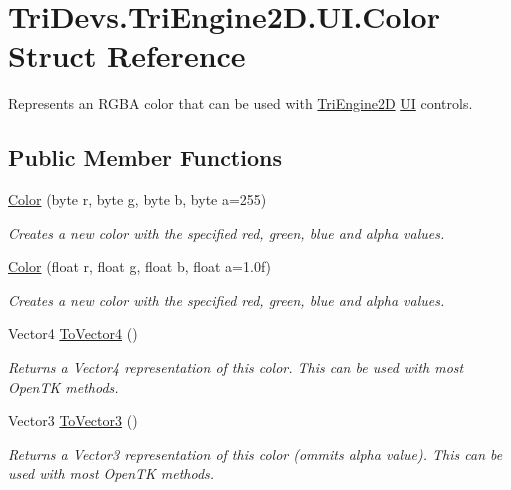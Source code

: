 \hypertarget{struct_tri_devs_1_1_tri_engine2_d_1_1_u_i_1_1_color}{\section{Tri\-Devs.\-Tri\-Engine2\-D.\-U\-I.\-Color Struct Reference}
\label{struct_tri_devs_1_1_tri_engine2_d_1_1_u_i_1_1_color}
}


Represents an R\-G\-B\-A color that can be used with \hyperlink{namespace_tri_devs_1_1_tri_engine2_d}{Tri\-Engine2\-D} \hyperlink{namespace_tri_devs_1_1_tri_engine2_d_1_1_u_i}{U\-I} controls.  


\subsection*{Public Member Functions}
\begin{DoxyCompactItemize}
\item 
\hyperlink{struct_tri_devs_1_1_tri_engine2_d_1_1_u_i_1_1_color_aa1f439e2810fd9c0e689c19a1f55f318}{Color} (byte r, byte g, byte b, byte a=255)
\begin{DoxyCompactList}\small\item\em Creates a new color with the specified red, green, blue and alpha values. \end{DoxyCompactList}\item 
\hyperlink{struct_tri_devs_1_1_tri_engine2_d_1_1_u_i_1_1_color_a67daec6327e5e101cdf9e5c7f0bfa599}{Color} (float r, float g, float b, float a=1.\-0f)
\begin{DoxyCompactList}\small\item\em Creates a new color with the specified red, green, blue and alpha values. \end{DoxyCompactList}\item 
Vector4 \hyperlink{struct_tri_devs_1_1_tri_engine2_d_1_1_u_i_1_1_color_af52575f201995b34e4e21e4ef6b6f41c}{To\-Vector4} ()
\begin{DoxyCompactList}\small\item\em Returns a Vector4 representation of this color. This can be used with most Open\-T\-K methods. \end{DoxyCompactList}\item 
Vector3 \hyperlink{struct_tri_devs_1_1_tri_engine2_d_1_1_u_i_1_1_color_ae4cbadf2e084e6080480f7f9c1be452d}{To\-Vector3} ()
\begin{DoxyCompactList}\small\item\em Returns a Vector3 representation of this color (ommits alpha value). This can be used with most Open\-T\-K methods. \end{DoxyCompactList}\end{DoxyCompactItemize}
